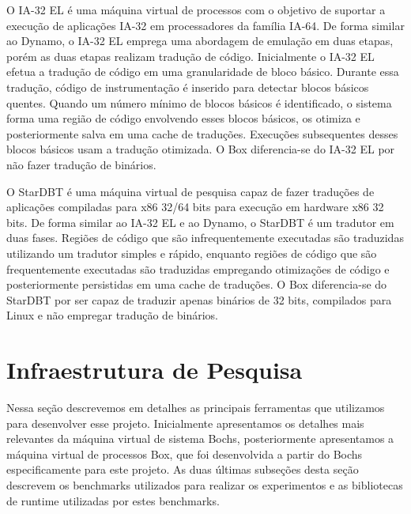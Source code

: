 \documentclass[11pt,twoside]{article}
\begin{document}
O IA-32 EL \cite{Baraz2003} é uma máquina virtual de processos com o
objetivo de suportar a execução de aplicações IA-32 em processadores
da família IA-64. De forma similar ao Dynamo, o IA-32 EL emprega uma
abordagem de emulação em duas etapas, porém as duas etapas realizam
tradução de código. Inicialmente o IA-32 EL efetua a tradução de
código em uma granularidade de bloco básico. Durante essa tradução,
código de instrumentação é inserido para detectar blocos básicos
quentes. Quando um número mínimo de blocos básicos é identificado, o
sistema forma uma região de código envolvendo esses blocos básicos, os
otimiza e posteriormente salva em uma cache de traduções. Execuções
subsequentes desses blocos básicos usam a tradução otimizada.  O Box
diferencia-se do IA-32 EL por não fazer tradução de binários.

O StarDBT \cite{Wang2007} é uma máquina virtual de pesquisa capaz de
fazer traduções de aplicações compiladas para x86 32/64 bits para
execução em hardware x86 32 bits. De forma similar ao IA-32 EL e ao
Dynamo, o StarDBT é um tradutor em duas fases. Regiões de código que
são infrequentemente executadas são traduzidas utilizando um tradutor
simples e rápido, enquanto regiões de código que são frequentemente
executadas são traduzidas empregando otimizações de código e
posteriormente persistidas em uma cache de traduções. O Box
diferencia-se do StarDBT por ser capaz de traduzir apenas binários de
32 bits, compilados para Linux e não empregar tradução de binários.



\section{Infraestrutura de Pesquisa} \label{sec:infraestrutura}

Nessa seção descrevemos em detalhes as principais ferramentas que
utilizamos para desenvolver esse projeto. Inicialmente apresentamos os
detalhes mais relevantes da máquina virtual de sistema Bochs,
posteriormente apresentamos a máquina virtual de processos Box, que
foi desenvolvida a partir do Bochs especificamente para este projeto.
As duas últimas subseções desta seção descrevem os benchmarks
utilizados para realizar os experimentos e as bibliotecas de runtime
utilizadas por estes benchmarks.
\end{document}
